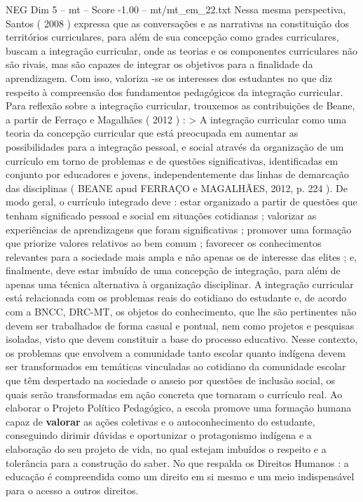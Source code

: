 \begin{textsample}{NEG Dim 5 – mt – Score -1.00 – mt/mt\_em\_22.txt}
Nessa mesma perspectiva, Santos ( 2008 ) expressa que as conversações e as narrativas na constituição dos territórios curriculares, para além de sua concepção como grades curriculares, buscam a integração curricular, onde as teorias e os componentes curriculares não são rivais, mas são capazes de integrar os objetivos para a finalidade da aprendizagem.
Com isso, valoriza -se os interesses dos estudantes no que diz respeito à compreensão dos fundamentos pedagógicos da integração curricular.
Para reflexão sobre a integração curricular, trouxemos as contribuições de Beane, a partir de Ferraço e Magalhães ( 2012 ) : > A integração curricular como uma teoria da concepção curricular que está preocupada em aumentar as possibilidades para a integração pessoal, e social através da organização de um currículo em torno de problemas e de questões significativas, identificadas em conjunto por educadores e jovens, independentemente das linhas de demarcação das disciplinas ( BEANE apud FERRAÇO e MAGALHÃES, 2012, p. 224 ).
De modo geral, o currículo integrado deve : estar organizado a partir de questões que tenham significado pessoal e social em situações cotidianas ; valorizar as experiências de aprendizagens que foram significativas ; promover uma formação que priorize valores relativos ao bem comum ; favorecer os conhecimentos relevantes para a sociedade mais ampla e não apenas os de interesse das elites ; e, finalmente, deve estar imbuído de uma concepção de integração, para além de apenas uma técnica alternativa à organização disciplinar.
A integração curricular está relacionada com os problemas reais do cotidiano do estudante e, de acordo com a BNCC, DRC-MT, os objetos do conhecimento, que lhe são pertinentes não devem ser trabalhados de forma casual e pontual, nem como projetos e pesquisas isoladas, visto que devem constituir a base do processo educativo.
Nesse contexto, os problemas que envolvem a comunidade tanto escolar quanto indígena devem ser transformados em temáticas vinculadas ao cotidiano da comunidade escolar que têm despertado na sociedade o anseio por questões de inclusão social, os quais serão transformadas em ação concreta que tornaram o currículo real.
Ao elaborar o Projeto Político Pedagógico, a escola promove uma formação humana capaz de \textbf{valorar} as ações coletivas e o autoconhecimento do estudante, conseguindo dirimir dúvidas e oportunizar o protagonismo indígena e a elaboração do seu projeto de vida, no qual estejam imbuídos o respeito e a tolerância para a construção do saber.
No que respalda os Direitos Humanos : a educação é compreendida como um direito em si mesmo e um meio indispensável para o acesso a outros direitos.

\end{textsample}
